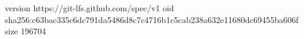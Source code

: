 version https://git-lfs.github.com/spec/v1
oid sha256:c63bac335c6dc791da5486d8c7c4716b1c5cab238a632e11680dc69455ba606f
size 196704
